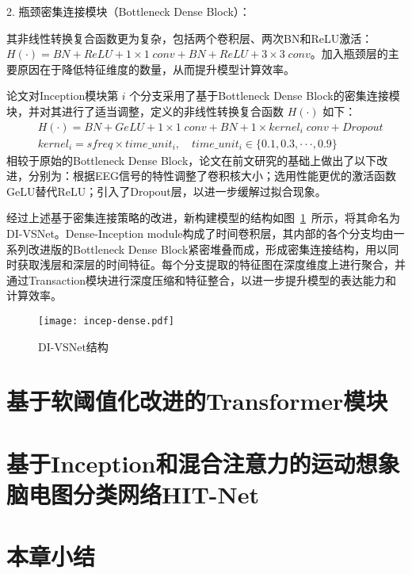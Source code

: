 2. 瓶颈密集连接模块（Bottleneck Dense Block）：

其非线性转换复合函数更为复杂，包括两个卷积层、两次BN和ReLU激活：\(H(·) = BN + ReLU + 1\times1\;conv + BN + ReLU + 3 \times 3\;conv\)。加入瓶颈层的主要原因在于降低特征维度的数量，从而提升模型计算效率。

论文对Inception模块第 \(i\) 个分支采用了基于Bottleneck Dense Block的密集连接模块，并对其进行了适当调整，定义的非线性转换复合函数 \(H(·)\) 如下：
\begin{equation}\label{eq:dense-kernel}
  \begin{split}
    &H(·) = BN + GeLU + 1\times1\;conv + BN +  1 \times kernel_i\;conv + Dropout \\
    &kernel_i = sfreq \times time\_unit_i, \quad time\_unit_i \in \{0.1, 0.3, ···, 0.9\}
  \end{split}
\end{equation}
相较于原始的Bottleneck Dense Block，论文在前文研究的基础上做出了以下改进，分别为：根据EEG信号的特性调整了卷积核大小；选用性能更优的激活函数GeLU替代ReLU；引入了Dropout层，以进一步缓解过拟合现象。

经过上述基于密集连接策略的改进，新构建模型的结构如图~\ref{fig:incep-dense}~所示，将其命名为DI-VSNet。Dense-Inception module构成了时间卷积层，其内部的各个分支均由一系列改进版的Bottleneck Dense Block紧密堆叠而成，形成密集连接结构，用以同时获取浅层和深层的时间特征。每个分支提取的特征图在深度维度上进行聚合，并通过Transaction模块进行深度压缩和特征整合，以进一步提升模型的表达能力和计算效率。
\begin{figure}
  \centering
  \texttt{[image: incep-dense.pdf]}
  \caption{DI-VSNet结构}
  \label{fig:incep-dense}
\end{figure}
\section{基于软阈值化改进的Transformer模块}


\section{基于Inception和混合注意力的运动想象脑电图分类网络HIT-Net}


\section{本章小结}